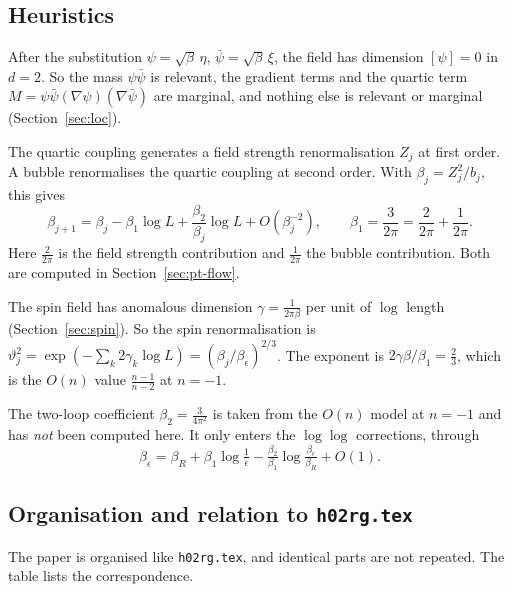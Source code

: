 \documentclass[11pt]{amsart}
\theoremstyle{definition}
\theoremstyle{remark}
\numberwithin{equation}{section}
\newcommand{\hr}{\texttt{h02rg.tex}}
\begin{document}
\subsection{Heuristics}
\label{sec:heur}
After the substitution $\psi=\sqrt\beta\,\eta$, $\bar\psi=\sqrt\beta\,\xi$, the field has
dimension $[\psi]=0$ in $d=2$. So the mass $\psi\bar\psi$ is relevant, the gradient terms and the
quartic term $M=\psi\bar\psi(\nabla\psi)(\nabla\bar\psi)$ are marginal, and nothing else is
relevant or marginal (Section~\ref{sec:loc}).

The quartic coupling generates a field strength renormalisation $Z_j$ at first order. A bubble
renormalises the quartic coupling at second order. With $\beta_j=Z_j^2/b_j$, this gives
\begin{equation}\label{e:beta}
  \beta_{j+1}=\beta_j-\beta_1\log L+\frac{\beta_2}{\beta_j}\log L+O(\beta_j^{-2}),\qquad
  \beta_1=\frac{3}{2\pi}=\frac{2}{2\pi}+\frac{1}{2\pi}.
\end{equation}
Here $\frac2{2\pi}$ is the field strength contribution and $\frac1{2\pi}$ the bubble
contribution. Both are computed in Section~\ref{sec:pt-flow}.

The spin field has anomalous dimension $\gamma=\frac1{2\pi\beta}$ per unit of $\log$ length
(Section~\ref{sec:spin}). So the spin renormalisation is
$\vartheta_j^2=\exp(-\sum_k2\gamma_k\log L)=(\beta_j/\beta_\epsilon)^{2/3}$. The exponent is
$2\gamma\beta/\beta_1=\frac23$, which is the $O(n)$ value $\frac{n-1}{n-2}$ at $n=-1$.

The two-loop coefficient $\beta_2=\frac3{4\pi^2}$ is taken from the $O(n)$ model at $n=-1$ and
has \emph{not} been computed here. It only enters the $\log\log$ corrections, through
\[
  \beta_\epsilon=\beta_R+\beta_1\log\tfrac1\epsilon-\tfrac{\beta_2}{\beta_1}\log\tfrac{\beta_\epsilon}{\beta_R}+O(1).
\]

\subsection{Organisation and relation to \hr}
\label{sec:org}
The paper is organised like \hr{}, and identical parts are not repeated. The table lists the
correspondence.
\end{document}
